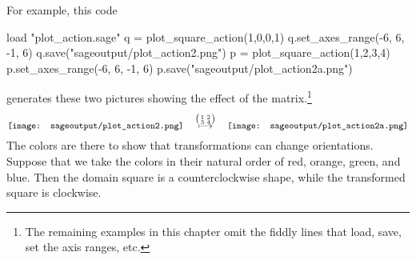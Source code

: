 For example, this code
\begin{sageoutput}
load "plot_action.sage"
q = plot_square_action(1,0,0,1) 
q.set_axes_range(-6, 6, -1, 6) 
q.save("sageoutput/plot_action2.png")
p = plot_square_action(1,2,3,4) 
p.set_axes_range(-6, 6, -1, 6) 
p.save("sageoutput/plot_action2a.png")
\end{sageoutput}
\noindent generates these two pictures showing the effect of the 
matrix.\footnote{The remaining examples in this chapter omit the 
fiddly lines that load, save, set the axis ranges, etc.}
\begin{equation*}
  \vcenteredhbox{\texttt{[image: sageoutput/plot\_action2.png]}}
  \quad\mapsunder{\big (\begin{smallmatrix} 1 &2 \\ 3 &4 \end{smallmatrix}\big )}\quad
  \vcenteredhbox{\texttt{[image: sageoutput/plot\_action2a.png]}}
\end{equation*}
The colors are there to show that transformations can change
orientations.
Suppose that we take the colors in their natural order of red, orange, 
green, and blue.
Then the domain square is a counterclockwise shape, while the transformed
square is clockwise.


